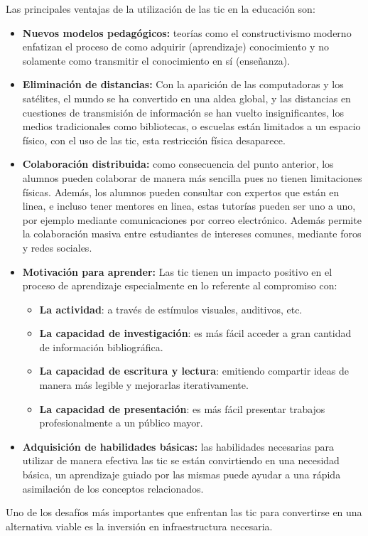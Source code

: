 Las principales ventajas de la utilización de las \Gls{tic} en la educación son:

\begin{itemize}

\item \textbf{Nuevos modelos pedagógicos:} teorías como el constructivismo moderno
    enfatizan el proceso de como adquirir (aprendizaje) conocimiento y no
    solamente como transmitir el conocimiento en sí
    (enseñanza)\cite{guenaga2013serious}.

\item \textbf{Eliminación de distancias:} Con la aparición de las computadoras y los
    satélites,  el mundo se ha convertido en una aldea global, y las distancias
    en cuestiones de transmisión de información se han vuelto
    insignificantes\cite{mohammed2013information},  los medios tradicionales
    como bibliotecas, o escuelas están limitados a un espacio  físico, con el
    uso de las \Gls{tic}, esta restricción física desaparece\cite{tinio:ict}.

\item \textbf{Colaboración distribuida:} como consecuencia del punto anterior, los
    alumnos pueden colaborar de manera más sencilla pues no tienen limitaciones
    físicas. Además, los alumnos pueden consultar con expertos que están en
    linea, e incluso tener mentores en linea, estas tutorías pueden ser uno a
    uno, por ejemplo mediante comunicaciones por correo electrónico. Además
    permite la colaboración masiva entre estudiantes de intereses comunes,
    mediante foros y redes sociales\cite{unesco:ict}.

\item \textbf{Motivación para aprender:} Las \Gls{tic} tienen un impacto positivo en el
    proceso de aprendizaje especialmente en lo referente al compromiso
    con\cite{passey2004motivational,egenfeldt2007third}:
	    
    \begin{itemize}
    \item \textbf{La actividad}: a través de estímulos visuales, auditivos, etc.
    \item \textbf{La capacidad de investigación}: es más fácil acceder a gran cantidad de
        información bibliográfica.
    \item \textbf{La capacidad de escritura y lectura}: emitiendo compartir  ideas de
        manera más legible y mejorarlas iterativamente.
    \item \textbf{La capacidad de presentación}: es más fácil presentar trabajos
        profesionalmente a un público mayor.
    \end{itemize}
	    
\item \textbf{Adquisición de habilidades básicas:} las habilidades necesarias para
    utilizar de manera efectiva las \Gls{tic} se están convirtiendo en una
    necesidad básica, un aprendizaje guiado por las mismas puede ayudar a una
    rápida asimilación de los conceptos relacionados.

\end{itemize}

Uno de los desafíos más importantes que enfrentan las \Gls{tic} para convertirse
en una alternativa viable es la inversión en infraestructura
necesaria\cite{unesco:ict}.

